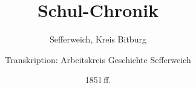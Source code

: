 



\frontmatter
\title{Schul-Chronik}
\subtitle{Sefferweich, Kreis Bitburg}
\author{Transkription: Arbeitskreis Geschichte Sefferweich}
\date{1851\,ff.}
\maketitle

\mainmatter
\beginnumbering

\pstart


\originalpagebreak

\pstart

\pend

\originalpagebreak



\originalpagebreak

\pstart


\originalpagebreak

\pstart


\originalpagebreak

\pstart


\originalpagebreak

\pstart


\originalpagebreak

\pstart


\originalpagebreak

\pstart


\originalpagebreak

\pstart


\originalpagebreak

\pstart


\originalpagebreak

\pstart


\originalpagebreak

\pstart


\originalpagebreak

\pstart


\originalpagebreak



\originalpagebreak

\pstart


